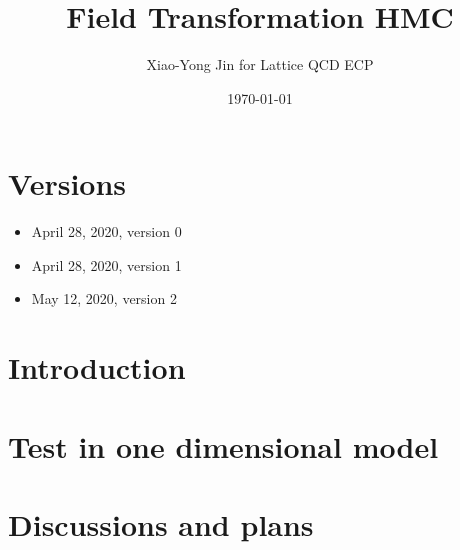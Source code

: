 


\author{Xiao-Yong Jin for Lattice QCD ECP}
\date{\today}
\title{Field Transformation HMC}


\maketitle
\tableofcontents

\section*{Versions}
\label{sec:versions}

\begin{itemize}
\item April 28, 2020, version 0
\item April 28, 2020, version 1
\item May 12, 2020, version 2
\end{itemize}

\section{Introduction}
\label{sec:intro}


\section{Test in one dimensional model}
\label{sec:test-1d}


\section{Discussions and plans}
\label{sec:discuss-plans}


\ifdefined\directlua
  \printbibliography
\else
  
  
\fi


